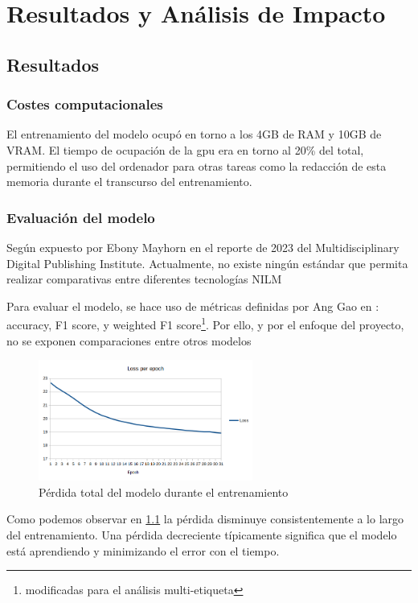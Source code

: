 \chapter{Resultados y Análisis de Impacto}

\section{Resultados}

\subsection{Costes computacionales}
El entrenamiento del modelo ocupó en torno a los 4GB de RAM y  10GB de VRAM. 
El tiempo de ocupación de la gpu era en torno al 20\% del total, permitiendo el uso del ordenador para otras tareas como la redacción de esta memoria durante el transcurso del entrenamiento.
\subsection{Evaluación del modelo}
Según expuesto por Ebony Mayhorn en el reporte de 2023 del Multidisciplinary Digital Publishing Institute.  Actualmente, no existe ningún estándar que permita realizar comparativas entre diferentes tecnologías NILM \autocite{NILMreview2023} \autocite{mayhorn2015load}

Para evaluar el modelo, se hace uso de métricas definidas por Ang Gao en \autocite{GAO2023109443}: accuracy, F1 score, y weighted F1 score\footnote{modificadas para el análisis multi-etiqueta}.
Por ello, y por el enfoque del proyecto, no se exponen comparaciones entre otros modelos
\begin{figure}[H]
    \centering
    \includegraphics[height=150px]{images/Losstable.png}
    \caption{Pérdida total del modelo durante el entrenamiento}
    \label{fig:loss}
\end{figure}

Como podemos observar en \ref{fig:loss} la pérdida disminuye consistentemente a lo largo del entrenamiento. Una pérdida decreciente típicamente significa que el modelo está aprendiendo y minimizando el error con el tiempo.

